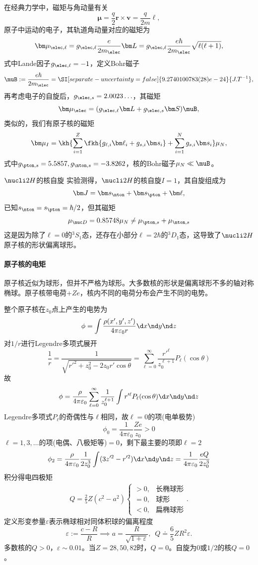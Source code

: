 在经典力学中，磁矩与角动量有关
\[
	\bm\mu=\frac{q}2\bm r\times\bm v=\frac{q}{2m}\bm\ell,
\]
原子中运动的电子，其轨道角动量对应的磁矩为
\[
	\bm\mu_{\elec,\ell}=g_{\elec,\ell}\frac{e}{2m_\elec}\bm L=g_{\elec,\ell}\frac{e\hbar}{2m_\elec}\sqrt{\ell(\ell+1)},
\]
式中Lande因子$g_{\elec,\ell}=-1$，定义Bohr磁子
\[
	\muB:=\frac{e\hbar}{2m_\elec}=\SI[separate-uncertainty = false]{9.2740100783(28)e-24}{J.T^{-1}},
\]
再考虑电子的自旋后，$g_{\elec,s}=2.0023\ldots$，其磁矩
\[
	\bm\mu_\elec=(g_{\elec,\ell}\bm L+g_{\elec,s}\bm S)\muB,
\]
类似的，我们有原子核的磁矩
\[
	\bm\mu_I=\kh{\sum_{i=1}^Z\fkh{g_{\ell,i}\bm\ell_i+g_{s,i}\bm s_i}+\sum_{i=1}^Ng_{s,i}\bm s_i}\mu_N,
\]
式中$g_{\pton,s}=5.5857,g_{\nton,s}=-3.8262$，核的Bohr磁子$\mu_N\ll\muB$。
\begin{example}{$\nucli2H$的核自旋}{}
	实验测得，$\nucli2H$的核自旋$I=1$，其自旋组成为
	\[
		\bm J=\bm s_\nton+\bm s_\pton+\bm\ell,
	\]
	已知$s_\nton=s_\pton=\hbar/2$，但其磁矩
	\[
		\mu_{\nuc D}=0.85748\mu_N\neq\mu_{\pton,s}+\mu_{\nton,s}
	\]
	这是因为除了$\ell=0$的$^3S_1$态，还存在小部分$\ell=2\hbar$的$^3D_1$态，这导致了$\nucli2H$原子核的形状偏离球形。
\end{example}
\paragraph{原子核的电矩}原子核近似为球形，但并不严格为球形。大多数核的形状是偏离球形不多的轴对称椭球。原子核带电荷$+Ze$，核内不同的电荷分布会产生不同的电势。

整个原子核在$z_0$点上产生的电势为
\[
	\phi=\int\frac{\rho(x',y',z')}{4\pi\varepsilon_0r}\d x\nd y\nd z
\]
对$1/r$进行Legendre多项式展开
\[
	\frac1r=\frac1{\sqrt{r'^2+z_0^2-2z_0r'\cos\theta}}=\sum_{\ell=0}^\infty \frac{r'^\ell}{z_0^{\ell+1}}P_\ell(\cos\theta)
\]
故
\[
	\phi=\frac\rho{4\pi\varepsilon_0}\sum_{\ell=0}^\infty\frac1{z_0^{\ell+1}}\int r'^\ell P_\ell(\cos\theta)\d x\nd y\nd z
\]
Legendre多项式$P_\ell$的奇偶性与$\ell$相同，故$\ell=0$的项(电单极势)
\[
	\phi_0=\frac1{4\pi\varepsilon_0}\frac{Ze}{z_0}>0
\]
$\ell=1,3,\ldots$的项(电偶、八极矩等)$=0$，剩下最主要的项即$\ell=2$
\[
	\phi_2=\frac\rho{4\pi\varepsilon_0}\frac1{2z_0^3}\int(3z'^2-r'^2)\d x\nd y\nd z=\frac1{4\pi\varepsilon_0}\frac{eQ}{2z_0^3}
\]
积分得电四极矩
\begin{align}
	Q=\frac25Z(c^2-a^2)\begin{cases}
		>0,&\text{长椭球形}\\
		=0,&\text{球形}\\
		<0,&\text{扁椭球形}
	\end{cases}.
\end{align}
定义形变参量$\varepsilon$表示椭球相对同体积球的偏离程度
\[
	\varepsilon:=\frac{c-R}R\implies a=\frac{R}{\sqrt{1+\varepsilon}},\enspace Q\doteq\frac65ZR^2\varepsilon.
\]
多数核的$Q>0$，$\varepsilon\sim 0.01$。当$Z=28,50,82$时，$Q=0$。自旋为0或$1/2$的核$Q=0$。

